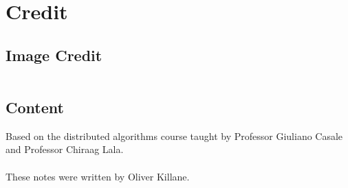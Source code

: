 \chapter{Credit}
\section*{Image Credit}
\begin{center}
	\begin{tabular}{r p{}}
	\end{tabular}
\end{center}

\section*{Content}
Based on the distributed algorithms course taught by Professor Giuliano Casale and Professor Chiraag Lala.
\\
\\ These notes were written by Oliver Killane.

